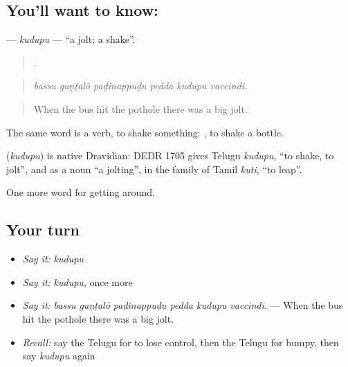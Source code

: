 \subsection*{You'll want to know: }
\textbf{} — \emph{kudupu} — \textquotedblleft{}a jolt; a shake\textquotedblright{}.

\begin{quote}
     .
\end{quote}

\begin{quote}
\emph{bassu guṇṭalō paḍinappuḍu pedda kudupu vaccindi.}
\end{quote}

\begin{quote}
When the bus hit the pothole there was a big jolt.
\end{quote}

The same word is a verb, to shake something:  , to shake a bottle.

\begin{cousinweb}
\textbf{} (\emph{kudupu}) is native Dravidian: DEDR 1705 gives Telugu \emph{kudupu}, \textquotedblleft{}to shake, to jolt\textquotedblright{}, and as a noun \textquotedblleft{}a jolting\textquotedblright{}, in the family of Tamil \emph{kuti}, \textquotedblleft{}to leap\textquotedblright{}.
\end{cousinweb}

\begin{grammarlens}[title={What you've built}]
One more word for getting around.
\end{grammarlens}

\subsection*{Your turn}
\begin{itemize}
\raggedright
  \item \emph{Say it:} \emph{kudupu}
  \item \emph{Say it:} \emph{kudupu}, once more
  \item \emph{Say it:} \emph{bassu guṇṭalō paḍinappuḍu pedda kudupu vaccindi.} — When the bus hit the pothole there was a big jolt.
  \item \emph{Recall:} say the Telugu for to lose control, then the Telugu for bumpy, then say \emph{kudupu} again
\end{itemize}

